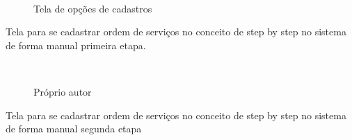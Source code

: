 \begin{figure}[H]
		\caption{\label{Cadastros_Sistema_1}Tela de opções de cadastros}
	\centering
	\mbox{%
		\qquad
	}
	
\end{figure}
\newpage

Tela para se cadastrar ordem de serviços no conceito de  step by step no sistema de forma manual primeira etapa.

\begin{figure}[H]
		\caption{\label{step_1}Próprio autor}
	\centering
	\mbox{%
		\qquad
	}
	
\end{figure}
\newpage

Tela para se cadastrar ordem de serviços no conceito de  step by step no sistema de forma manual segunda etapa


